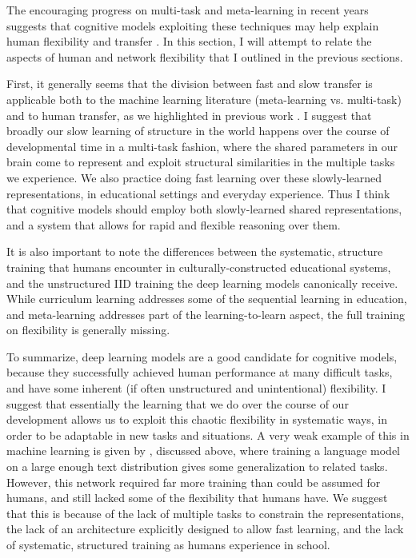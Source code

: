 \documentclass[11pt]{article}
\begin{document}
The encouraging progress on multi-task and meta-learning in recent years suggests that cognitive models exploiting these techniques may help explain human flexibility and transfer \citep{Hansen2017}. In this section, I will attempt to relate the aspects of human and network flexibility that I outlined in the previous sections. \par 
First, it generally seems that the division between fast and slow transfer is applicable both to the machine learning literature (meta-learning vs. multi-task) and to human transfer, as we highlighted in previous work \citep{Lampinen2017a}. I suggest that broadly our slow learning of structure in the world happens over the course of developmental time in a multi-task fashion, where the shared parameters in our brain come to represent and exploit structural similarities in the multiple tasks we experience. We also practice doing fast learning over these slowly-learned representations, in educational settings and everyday experience. Thus I think that cognitive models should employ both slowly-learned shared representations, and a system that allows for rapid and flexible reasoning over them. \par 
It is also important to note the differences between the systematic, structure training that humans encounter in culturally-constructed educational systems, and the unstructured IID training the deep learning models canonically receive. While curriculum learning addresses some of the sequential learning in education, and meta-learning addresses part of the learning-to-learn aspect, the full training on flexibility is generally missing. \par
To summarize, deep learning models are a good candidate for cognitive models, because they successfully achieved human performance at many difficult tasks, and have some inherent (if often unstructured and unintentional) flexibility. I suggest that essentially the learning that we do over the course of our development allows us to exploit this chaotic flexibility in systematic ways, in order to be adaptable in new tasks and situations. A very weak example of this in machine learning is given by \citet{Radford2019}, discussed above, where training a language model on a large enough text distribution gives some generalization to related tasks. However, this network required far more training than could be assumed for humans, and still lacked some of the flexibility that humans have. We suggest that this is because of the lack of multiple tasks to constrain the representations, the lack of an architecture explicitly designed to allow fast learning, and the lack of systematic, structured training as humans experience in school. \par 
\end{document}
